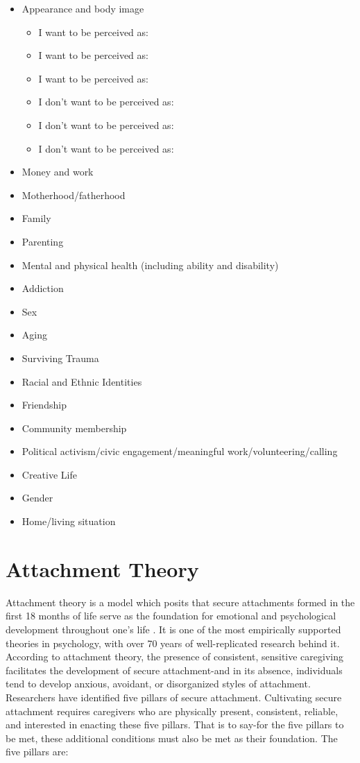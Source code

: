 \documentclass[12pt,letterpaper]{book}
\begin{document}
\begin{itemize}
    \item Appearance and body image
    \begin{itemize}
        \item I want to be perceived as:
        \item I want to be perceived as:
        \item I want to be perceived as:
        \item I don't want to be perceived as:
        \item I don't want to be perceived as:
        \item I don't want to be perceived as:
    \end{itemize}
    \item Money and work
    \item Motherhood/fatherhood
    \item Family
    \item Parenting
    \item Mental and physical health (including ability and disability)
    \item Addiction
    \item Sex
    \item Aging
    \item Surviving Trauma
    \item Racial and Ethnic Identities
    \item Friendship
    \item Community membership
    \item Political activism/civic engagement/meaningful work/volunteering/calling
    \item Creative Life
    \item Gender
    \item Home/living situation
\end{itemize}
\chapter{Attachment Theory}
\label{attachment}
Attachment theory is a model which posits that secure attachments formed in the first 18 months of life serve as the foundation for emotional and psychological development throughout one's life \cite{brownAttachmentDisturbances}. It is one of the most empirically supported theories in psychology, with over 70 years of well-replicated research behind it. According to attachment theory, the presence of consistent, sensitive caregiving facilitates the development of secure attachment-and in its absence, individuals tend to develop anxious, avoidant, or disorganized styles of attachment. Researchers have identified five pillars of secure attachment. Cultivating secure attachment requires caregivers who are physically present, consistent, reliable, and interested in enacting these five pillars. That is to say-for the five pillars to be met, these additional conditions must also be met as their foundation. The five pillars are:
\end{document}
